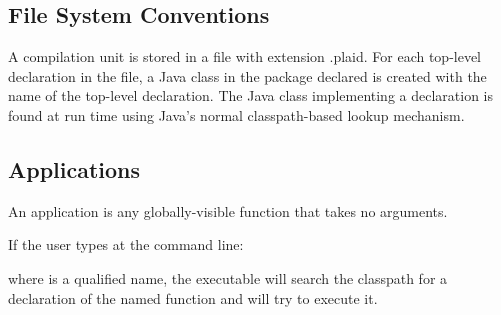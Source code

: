 \subsection{File System Conventions}

A compilation unit is stored in a file with extension .plaid.  For each
top-level declaration in the file, a Java class in the package declared
is created with the name of the top-level declaration.  The Java class
implementing a declaration is found at run time using Java's normal
classpath-based lookup mechanism.




\subsection{Applications}

An application is any globally-visible function that takes no arguments.

\noindent
If the user types at the command line:

\begin{quote}
\end{quote}

\noindent
where  is a qualified name, the 
executable will search the classpath for a declaration of the named
function and will try to execute it.


